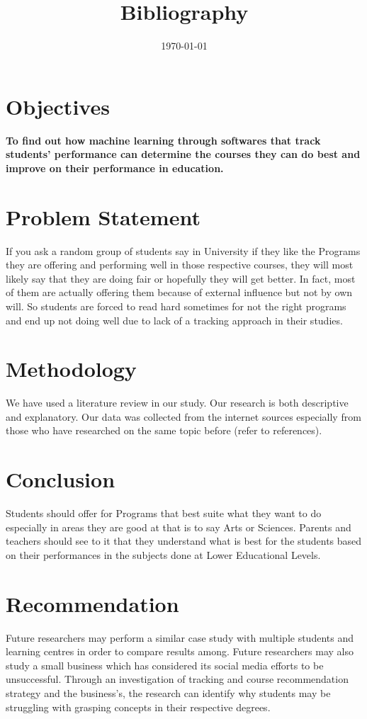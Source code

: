 \documentclass{article}
\begin{document}
\section{Objectives}
\textbf{To find out how machine learning through softwares that track students' performance can determine the courses they can do best and improve on their performance in education.}

\section{Problem Statement}
If you ask a random group of students say in University if they like the Programs they are offering and performing well in those respective courses, they will most likely say that they are doing fair or hopefully they will get better. In fact, most of them are actually offering them because of external influence but not by own will. So students are forced to read hard sometimes for not the right programs and end up not doing well due to lack of a tracking approach in their studies.

\section{Methodology}
We have used a literature review in our study. Our research is both descriptive and explanatory. Our data was collected from the internet sources especially from those who have researched on the same topic before (refer to references).

\section{Conclusion}
Students should offer for Programs that best suite what they want to do especially in areas they are good at that is to say Arts or Sciences. Parents and teachers should see to it that they understand what is best for the students based on their performances in the subjects done at Lower Educational Levels.

\section{Recommendation}
Future researchers may perform a similar case study with multiple students and learning centres in order to compare results among. Future researchers may also study a small business which has considered its
social media efforts to be unsuccessful. Through an investigation of tracking and course recommendation strategy and the business’s, the research can identify why students may be struggling with grasping concepts in their respective degrees.

\title{Bibliography}
\author{}
\maketitle
\date{\today}



\end{document}
